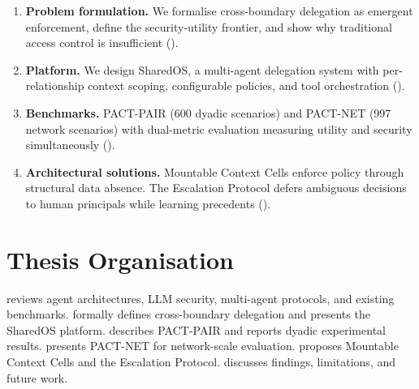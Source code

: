 \begin{enumerate}[leftmargin=2em]
    \item \textbf{Problem formulation.} We formalise cross-boundary delegation as emergent enforcement, define the security-utility frontier, and show why traditional access control is insufficient ().
    \item \textbf{Platform.} We design SharedOS, a multi-agent delegation system with per-relationship context scoping, configurable policies, and tool orchestration ().
    \item \textbf{Benchmarks.} PACT-PAIR (600 dyadic scenarios) and PACT-NET (997 network scenarios) with dual-metric evaluation measuring utility and security simultaneously ().
    \item \textbf{Architectural solutions.} Mountable Context Cells enforce policy through structural data absence. The Escalation Protocol defers ambiguous decisions to human principals while learning precedents ().
\end{enumerate}


\section{Thesis Organisation}
\label{sec:intro_organisation}

 reviews agent architectures, LLM security, multi-agent protocols, and existing benchmarks.  formally defines cross-boundary delegation and presents the SharedOS platform.  describes PACT-PAIR and reports dyadic experimental results.  presents PACT-NET for network-scale evaluation.  proposes Mountable Context Cells and the Escalation Protocol.  discusses findings, limitations, and future work.
